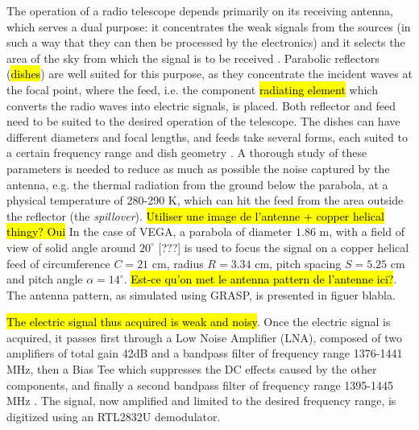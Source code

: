 The operation of a radio telescope depends primarily on its receiving antenna, which serves a dual purpose: it concentrates the weak signals from the sources (in such a way that they can then be processed by the electronics) and it selects the area of the sky from which the signal is to be received \cite{lauterbach_radio_2022}.
Parabolic reflectors (\hl{dishes}) are well suited for this purpose, as they concentrate the incident waves at the focal point, where the feed, i.e. the component \hl{radiating element} which converts the radio waves into electric signals, is placed.
Both reflector and feed need to be suited to the desired operation of the telescope.
The dishes can have different diameters and focal lengths, and
feeds take several forms, each suited to a certain frequency range and dish geometry \cite{lauterbach_radio_2022}. 
A thorough study of these parameters is needed to reduce as much as possible the noise captured by the antenna, e.g. the thermal radiation from the ground below the parabola, at a physical temperature of 280-290 K, which can hit the feed from the area outside the reflector (the \emph{spillover})\footnotemark \cite{burke_introduction_2013}.
\hl{Utiliser une image de l'antenne + copper helical thingy? Oui}
In the case of VEGA, a parabola of diameter $1.86$ m, with a field of view of solid angle around $20^{\circ}$ [???] is used to focus the signal on a copper helical feed of circumference $C = 21$ cm, radius $R = 3.34$ cm, pitch spacing $S = 5.25$ cm and pitch angle $\alpha = 14^{\circ}$. \hl{Est-ce qu'on met le antenna pattern de l'antenne ici?}. The antenna pattern, as simulated using GRASP, is presented in figuer blabla.

\hl{The electric signal thus acquired is weak and noisy}.
Once the electric signal is acquired, it passes first through a Low Noise Amplifier (LNA), composed of two amplifiers of total gain 42dB and a bandpass filter of frequency range 1376-1441 MHz, then a Bias Tee which suppresses the DC effects caused by the other components, and finally a second bandpass filter of frequency range 1395-1445 MHz \cite{interdisciplinary_project_2022}.
The signal, now amplified and limited to the desired frequency range, is digitized using an RTL2832U demodulator. 


